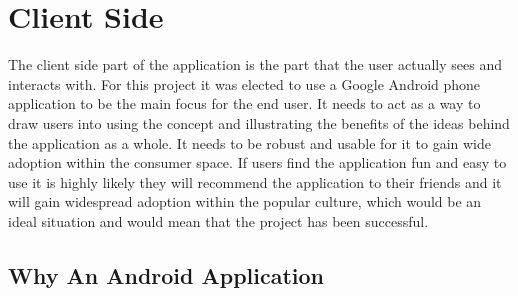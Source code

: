 \section{Client Side}

The client side part of the application is the part that the user actually sees and interacts with. For this project it was elected to use a Google Android phone application to be the main focus for the end user. It needs to act as a way to draw users into using the concept and illustrating the benefits of the ideas behind the application as a whole. It needs to be robust and usable for it to gain wide adoption within the consumer space. If users find the application fun and easy to use it is highly likely they will recommend the application to their friends and it will gain widespread adoption within the popular culture, which would be an ideal situation and would mean that the project has been successful.

\subsection{Why An Android Application}

